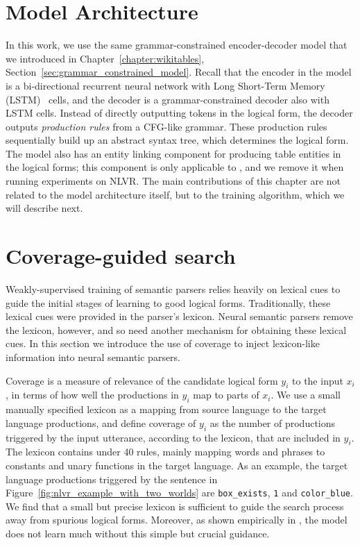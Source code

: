 \section{Model Architecture}\label{sec:type_constrained_decoding}
In this work, we use the same grammar-constrained
encoder-decoder model that we introduced in Chapter~\ref{chapter:wikitables},
Section~\ref{sec:grammar_constrained_model}.
Recall that the encoder in the model is a bi-directional recurrent neural network with Long
Short-Term Memory (LSTM)~\citep{hochreiter1997long} cells, and the decoder is a
grammar-constrained decoder also with LSTM cells.  Instead of directly
outputting tokens in the logical form, the decoder outputs \emph{production
rules} from a CFG-like grammar.  These production rules sequentially build up an
abstract syntax tree, which determines the logical form.  The model also has an
entity linking component for producing table entities in the logical forms; this
component is only applicable to \WTQ{}, and we remove it when running
experiments on NLVR\@.  The main contributions of this chapter are not related to
the model architecture itself, but to the training algorithm, which we will
describe next.

\section{Coverage-guided search}\label{sec:coverage_guided_search}

Weakly-supervised training of semantic parsers relies heavily on lexical cues to
guide the initial stages of learning to good logical forms.  Traditionally,
these lexical cues were provided in the parser's lexicon.  Neural semantic
parsers remove the lexicon, however, and so need another mechanism for obtaining
these lexical cues.  In this section we introduce the use of coverage to inject
lexicon-like information into neural semantic parsers.

Coverage is a measure of relevance of the candidate logical form $y_i$ to the
input $x_i$, in terms of how well the productions in $y_i$ map to parts of
$x_i$. We use a small manually specified lexicon as a mapping from source
language to the target language productions, and define coverage of $y_i$ as the
number of productions triggered by the input utterance, according to the
lexicon, that are included in $y_i$. The lexicon contains under 40 rules, mainly
mapping words and phrases to constants and unary functions in the target
language. As an example, the target language productions triggered by the sentence in
Figure~\ref{fig:nlvr_example_with_two_worlds} are \texttt{box\_exists}, \texttt{1} and
\texttt{color\_blue}. We find that a small but precise lexicon is sufficient to
guide the search process away from spurious logical forms. Moreover, as shown
empirically in , the model does not learn much
without this simple but crucial guidance.

